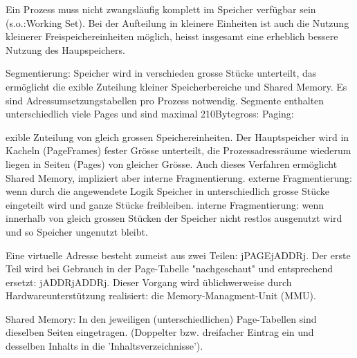 \begin{answer}
Ein Prozess muss nicht zwangsläufig komplett im Speicher verfügbar sein (s.o.:Working
Set). Bei der Aufteilung in kleinere Einheiten ist auch die Nutzung kleinerer Freispeichereinheiten möglich, heisst insgesamt eine erheblich bessere Nutzung des Haupspeichers.
\end{answer}

\begin{answer}
Segmentierung:
Speicher wird in verschieden grosse Stücke unterteilt, das ermöglicht die 
exible Zuteilung
kleiner Speicherbereiche und Shared Memory.
Es sind Adressumsetzungstabellen pro Prozess notwendig.
Segmente enthalten unterschiedlich viele Pages und sind maximal 210Bytegross:
Paging:

exible Zuteilung von gleich grossen Speichereinheiten. Der Hauptspeicher wird in Kacheln (PageFrames)
fester Grösse unterteilt, die Prozessadressräume wiederum liegen in Seiten (Pages) von
gleicher Grösse. Auch dieses Verfahren ermöglicht Shared Memory, impliziert aber interne Fragmentierung.
externe Fragmentierung: wenn durch die angewendete Logik Speicher in unterschiedlich grosse
Stücke eingeteilt wird und ganze Stücke freibleiben.
interne Fragmentierung: wenn innerhalb von gleich grossen Stücken der Speicher nicht restlos
ausgenutzt wird und so Speicher ungenutzt bleibt.
\end{answer}

\begin{answer}
Eine virtuelle Adresse besteht zumeist aus zwei Teilen: jPAGEjADDRj. Der erste Teil wird bei Gebrauch in der Page-Tabelle "nachgeschaut" und entsprechend ersetzt: jADDRjADDRj.
Dieser Vorgang wird üblichwerweise durch Hardwareunterstützung realisiert: die Memory-Managment-Unit (MMU).
\end{answer}

\begin{answer}
Shared Memory:
In den jeweiligen (unterschiedlichen) Page-Tabellen sind dieselben Seiten eingetragen. (Doppelter bzw. dreifacher Eintrag ein und desselben Inhalts in die 'Inhaltsverzeichnisse').
\end{answer}

